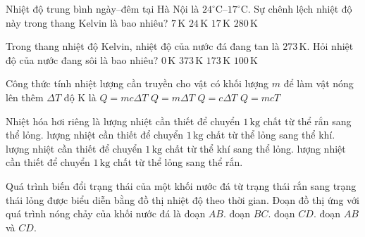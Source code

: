 \begin{ex}
	Nhiệt độ trung bình ngày--đêm tại Hà Nội là $24^\circ\mathrm{C}$--$17^\circ\mathrm{C}$. Sự chênh lệch nhiệt độ này trong thang Kelvin là bao nhiêu?
	\choice
	{\True $7\,\mathrm{K}$}
	{$24\,\mathrm{K}$}
	{$17\,\mathrm{K}$}
	{$280\,\mathrm{K}$}
\end{ex}

\begin{ex}
	Trong thang nhiệt độ Kelvin, nhiệt độ của nước đá đang tan là $273\,\mathrm{K}$. Hỏi nhiệt độ của nước đang sôi là bao nhiêu?
	\choice
	{$0\,\mathrm{K}$}
	{\True $373\,\mathrm{K}$}
	{$173\,\mathrm{K}$}
	{$100\,\mathrm{K}$}
\end{ex}


\begin{ex}
	Công thức tính nhiệt lượng cần truyền cho vật có khối lượng $m$ để làm vật nóng lên thêm $\Delta T$ độ K là
	\choice
	{\True $Q=mc\Delta T$}
	{$Q=m\Delta T$}
	{$Q=c\Delta T$}
	{$Q=mcT$}
\end{ex}

\begin{ex}
	Nhiệt hóa hơi riêng là
	\choice
	{lượng nhiệt cần thiết để chuyển $1\,\mathrm{kg}$ chất từ thể rắn sang thể lỏng.}
	{\True lượng nhiệt cần thiết để chuyển $1\,\mathrm{kg}$ chất từ thể lỏng sang thể khí.}
	{lượng nhiệt cần thiết để chuyển $1\,\mathrm{kg}$ chất từ thể khí sang thể lỏng.}
	{lượng nhiệt cần thiết để chuyển $1\,\mathrm{kg}$ chất từ thể lỏng sang thể rắn.}
\end{ex}

\begin{ex}
	Quá trình biến đổi trạng thái của một khối nước đá từ trạng thái rắn sang trạng thái lỏng được biểu diễn bằng đồ thị nhiệt độ theo thời gian. Đoạn đồ thị ứng với quá trình nóng chảy của khối nước đá là
	\choice
	{đoạn $AB$.}
	{\True đoạn $BC$.}
	{đoạn $CD$.}
	{đoạn $AB$ và $CD$.}
\end{ex}

